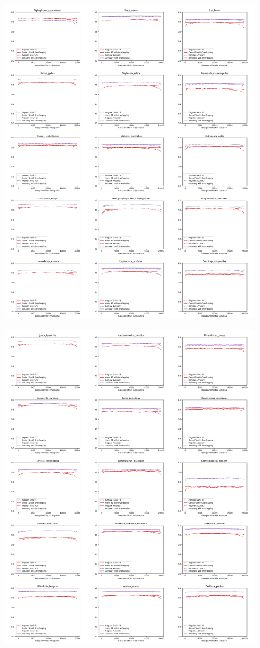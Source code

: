 \documentclass{article}
\begin{document}
\begin{figure}[!h]
\centerline{\includegraphics[width=1.2\textwidth]{images/overlapping/montage_animals4}}
\end{figure}
\begin{figure}[!h]
\centerline{\includegraphics[width=1.2\textwidth]{images/overlapping/montage_animals5}}
\end{figure}
\end{document}
